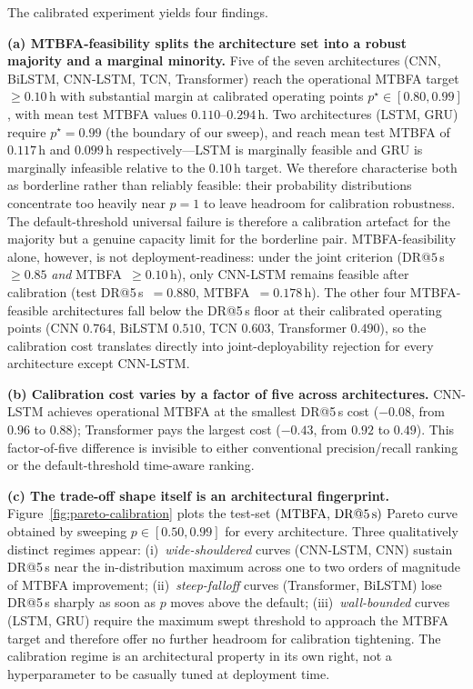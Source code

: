 \documentclass{ieeeaccess}
\begin{document}
The calibrated experiment yields four findings.

\textbf{(a) MTBFA-feasibility splits the architecture set into a robust majority
and a marginal minority.}
Five of the seven architectures (CNN, BiLSTM, CNN-LSTM, TCN, Transformer)
reach the operational MTBFA target $\geq 0.10$\,h with substantial margin
at calibrated operating points $p^\star \in [0.80, 0.99]$, with mean test
MTBFA values $0.110$--$0.294$\,h.
Two architectures (LSTM, GRU) require $p^\star = 0.99$ (the boundary of
our sweep), and reach mean test MTBFA of $0.117$\,h and $0.099$\,h
respectively---LSTM is marginally feasible and GRU is marginally
infeasible relative to the $0.10$\,h target. We therefore characterise
both as borderline rather than reliably feasible: their probability
distributions concentrate too heavily near $p=1$ to leave headroom for
calibration robustness.
The default-threshold universal failure is therefore a calibration
artefact for the majority but a genuine capacity limit for the borderline
pair.
MTBFA-feasibility alone, however, is not deployment-readiness:
under the joint criterion (DR@$5\,$s~$\geq 0.85$ \emph{and}
MTBFA~$\geq 0.10$\,h), only CNN-LSTM remains feasible after calibration
(test DR@5\,s~$=0.880$, MTBFA~$=0.178$\,h). The other four
MTBFA-feasible architectures fall below the DR@5\,s floor at their
calibrated operating points (CNN $0.764$, BiLSTM $0.510$, TCN $0.603$,
Transformer $0.490$), so the calibration cost translates directly into
joint-deployability rejection for every architecture except CNN-LSTM.

\textbf{(b) Calibration cost varies by a factor of five across architectures.}
CNN-LSTM achieves operational MTBFA at the smallest DR@5\,s cost
($-0.08$, from $0.96$ to $0.88$);
Transformer pays the largest cost
($-0.43$, from $0.92$ to $0.49$). This factor-of-five difference
is invisible to either conventional precision/recall ranking or the
default-threshold time-aware ranking.

\textbf{(c) The trade-off shape itself is an architectural fingerprint.}
Figure~\ref{fig:pareto-calibration} plots the test-set
$(\text{MTBFA},\,\text{DR@5\,s})$ Pareto curve obtained by sweeping
$p \in [0.50, 0.99]$ for every architecture.
Three qualitatively distinct regimes appear:
(i)~\emph{wide-shouldered} curves (CNN-LSTM, CNN) sustain DR@5\,s
near the in-distribution maximum across one to two orders of magnitude
of MTBFA improvement;
(ii)~\emph{steep-falloff} curves (Transformer, BiLSTM) lose DR@5\,s
sharply as soon as $p$ moves above the default;
(iii)~\emph{wall-bounded} curves (LSTM, GRU) require the maximum
swept threshold to approach the MTBFA target and therefore offer no
further headroom for calibration tightening.
The calibration regime is an architectural property in its own right,
not a hyperparameter to be casually tuned at deployment time.
\end{document}
